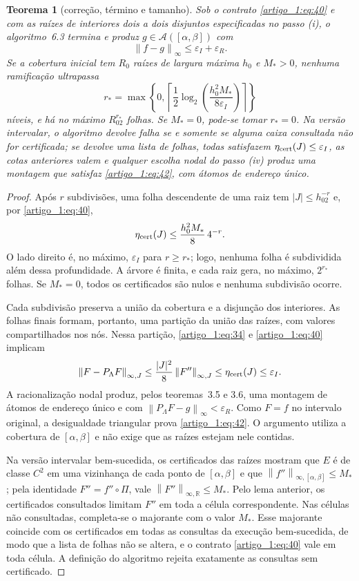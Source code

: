 \documentclass[12pt,a4paper]{article}
\theoremstyle{preciso}
\newtheorem{teorema}{Teorema}[section]
\theoremstyle{definition}
\newcommand{\R}{\mathbb R}
\newcommand{\Asm}{\mathcal A}
\newcommand{\norm}[1]{\left\|#1\right\|_{\infty}}
\newcommand{\normK}[2]{\left\|#1\right\|_{\infty,#2}}
\newcommand{\eqn}[2]{\begin{equation}\label{eq:#1}#2\end{equation}}
\theoremstyle{preciso}
\theoremstyle{preciso}
\theoremstyle{preciso}
\theoremstyle{preciso}
\theoremstyle{definition}
\theoremstyle{preciso}
\theoremstyle{definition}
\theoremstyle{preciso}
\theoremstyle{preciso}
\theoremstyle{definition}
\begin{document}
\begin{teorema}[correção, término e tamanho]\label{map:artigo_1:6.4}
Sob o contrato \eqref{artigo_1:eq:40} e com as raízes de interiores dois a dois disjuntos especificadas no passo (i), o algoritmo~6.3 termina e produz $g\in\Asm([\alpha,\beta])$ com
\eqn{42}{\norm{f-g}\le\varepsilon_I+\varepsilon_R.}
Se a cobertura inicial tem $R_0$ raízes de largura máxima $h_0$ e $M_*>0$, nenhuma ramificação ultrapassa
\eqn{43}{r_*=\max\left\{0,\left\lceil\frac12\log_2\left(\frac{h_0^2M_*}{8\varepsilon_I}\right)\right\rceil\right\}}
níveis, e há no máximo $R_02^{r_*}$ folhas. Se $M_*=0$, pode-se tomar $r_*=0$. Na versão intervalar, o algoritmo devolve falha se e somente se alguma caixa consultada não for certificada; se devolve uma lista de folhas, todas satisfazem $\eta_{\rm cert}(J)\le\varepsilon_I$, as cotas anteriores valem e qualquer escolha nodal do passo (iv) produz uma montagem que satisfaz \eqref{artigo_1:eq:42}, com átomos de endereço único.
\end{teorema}
\begin{proof}
Após $r$ subdivisões, uma folha descendente de uma raiz tem $|J|\le h_02^{-r}$ e, por \eqref{artigo_1:eq:40},
\[
\eta_{\rm cert}(J)\le\frac{h_0^2M_*}8\,4^{-r}.
\]
O lado direito é, no máximo, $\varepsilon_I$ para $r\ge r_*$; logo, nenhuma folha é subdividida além dessa profundidade. A árvore é finita, e cada raiz gera, no máximo, $2^{r_*}$ folhas. Se $M_*=0$, todos os certificados são nulos e nenhuma subdivisão ocorre.

Cada subdivisão preserva a união da cobertura e a disjunção dos interiores. As folhas finais formam, portanto, uma partição da união das raízes, com valores compartilhados nos nós. Nessa partição, \eqref{artigo_1:eq:34} e \eqref{artigo_1:eq:40} implicam
\[
\normK{F-P_\Lambda F}{J}\le\frac{|J|^2}8\normK{F''}{J}\le\eta_{\rm cert}(J)\le\varepsilon_I.
\]
A racionalização nodal produz, pelos teoremas~3.5 e 3.6, uma montagem de átomos de endereço único e com $\norm{P_\Lambda F-g}<\varepsilon_R$. Como $F=f$ no intervalo original, a desigualdade triangular prova \eqref{artigo_1:eq:42}. O argumento utiliza a cobertura de $[\alpha,\beta]$ e não exige que as raízes estejam nele contidas.

Na versão intervalar bem-sucedida, os certificados das raízes mostram que $E$ é de classe $C^2$ em uma vizinhança de cada ponto de $[\alpha,\beta]$ e que $\normK{f''}{[\alpha,\beta]}\le M_*$; pela identidade $F''=f''\circ\Pi$, vale $\normK{F''}{\R}\le M_*$. Pelo lema anterior, os certificados consultados limitam $F''$ em toda a célula correspondente. Nas células não consultadas, completa-se o majorante com o valor $M_*$. Esse majorante coincide com os certificados em todas as consultas da execução bem-sucedida, de modo que a lista de folhas não se altera, e o contrato \eqref{artigo_1:eq:40} vale em toda célula. A definição do algoritmo rejeita exatamente as consultas sem certificado.
\end{proof}
\end{document}
